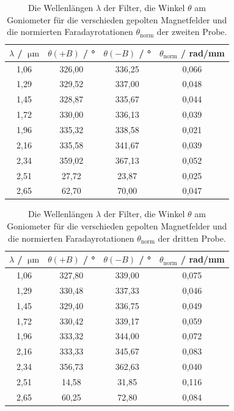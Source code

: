 \begin{table}
  \centering
  \begin{tabular}{c c c c}
    \toprule
    $\lambda$ / $\SI{}{\micro\metre}$ & $\theta(+B)$ / ° & $\theta(-B)$ / ° & $\theta_{\mathrm{norm}}$ / rad/mm\\
    \midrule
        1,06  & 326,00 & 336,25 & 0,066  \\
        1,29  & 329,52 & 337,00 & 0,048  \\
        1,45  & 328,87 & 335,67 & 0,044  \\
        1,72  & 330,00 & 336,13 & 0,039  \\
        1,96  & 335,32 & 338,58 & 0,021  \\
        2,16  & 335,58 & 341,67 & 0,039  \\
        2,34  & 359,02 & 367,13 & 0,052  \\
        2,51  &  27,72 &  23,87 & 0,025  \\
        2,65  &  62,70 &  70,00 & 0,047  \\
    \bottomrule
  \end{tabular}
  \caption{Die Wellenlängen $\lambda$ der Filter, die Winkel $\theta$ am Goniometer für die verschieden gepolten Magnetfelder und die
  normierten Faradayrotationen $\theta_{\mathrm{norm}}$ der zweiten Probe.}
  \label{tab:theta2}
\end{table}


\begin{table}
  \centering
  \begin{tabular}{c c c c}
    \toprule
    $\lambda$ / $\SI{}{\micro\metre}$ & $\theta(+B)$ / ° & $\theta(-B)$ / ° & $\theta_{\mathrm{norm}}$ / rad/mm\\
    \midrule
        1,06  & 327,80 & 339,00 & 0,075\\  
        1,29  & 330,48 & 337,33 & 0,046\\  
        1,45  & 329,40 & 336,75 & 0,049\\  
        1,72  & 330,42 & 339,17 & 0,059\\  
        1,96  & 333,32 & 344,00 & 0,072\\  
        2,16  & 333,33 & 345,67 & 0,083\\  
        2,34  & 356,73 & 362,63 & 0,040\\  
        2,51  & 14,58  & 31,85  & 0,116\\  
        2,65  & 60,25  & 72,80  & 0,084\\  
    \bottomrule
  \end{tabular}
  \caption{Die Wellenlängen $\lambda$ der Filter, die Winkel $\theta$ am Goniometer für die verschieden gepolten Magnetfelder und die
  normierten Faradayrotationen $\theta_{\mathrm{norm}}$ der dritten Probe.}
  \label{tab:theta3}
\end{table}

